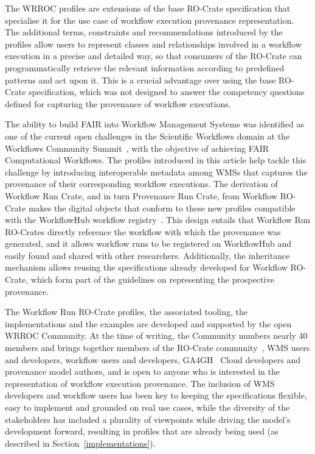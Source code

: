 \documentclass[10pt,letterpaper]{article}
\begin{document}
The WRROC profiles are extensions of the base RO-Crate specification that specialise it for the use case of workflow execution provenance representation. The additional terms, constraints and recommendations introduced by the profiles allow users to represent classes and relationships involved in a workflow execution in a precise and detailed way, so that consumers of the RO-Crate can programmatically retrieve the relevant information according to predefined patterns and act upon it. This is a crucial advantage over using the base RO-Crate specification, which was not designed to answer the competency questions defined for capturing the provenance of workflow executions.

The ability to build FAIR into Workflow Management Systems was identified as one of the current open challenges in the Scientific Workflows domain at
the Workflows Community Summit~\cite{Ferreira 2023}, with the objective of achieving FAIR Computational Workflows. The profiles introduced in this article help tackle this challenge by introducing interoperable metadata among WMSs that captures the provenance of their corresponding workflow executions.
%
The derivation of Workflow Run Crate, and in turn Provenance Run Crate, from Workflow RO-Crate makes the digital objects that conform to these new profiles compatible with the WorkflowHub workflow registry~\cite{Goble 2021}. This design entails that Workflow Run RO-Crates directly reference the workflow with which the provenance was generated, and it allows workflow runs to be registered on WorkflowHub and easily found and shared with other researchers. Additionally, the inheritance mechanism allows reusing the specifications already developed for Workflow RO-Crate, which form part of the guidelines on representing the prospective provenance.

The Workflow Run RO-Crate profiles, the associated tooling, the implementations and the examples are developed and supported by the open WRROC Community.
At the time of writing, the Community numbers nearly 40 members and brings together members of the RO-Crate community~\cite{Soiland-Reyes 2022a}, WMS users and developers, workflow users and developers, GA4GH~\cite{Rehm 2021} Cloud developers and provenance model authors, and is open to anyone who is interested in the representation of workflow execution provenance.
The inclusion of WMS developers and workflow users has been key to keeping the specifications flexible, easy to implement and grounded on real use cases, while the diversity of the stakeholders has included a plurality of viewpoints while driving the model's development forward, resulting in profiles that are already being used (as described in Section~\ref{implementations}).
\end{document}
